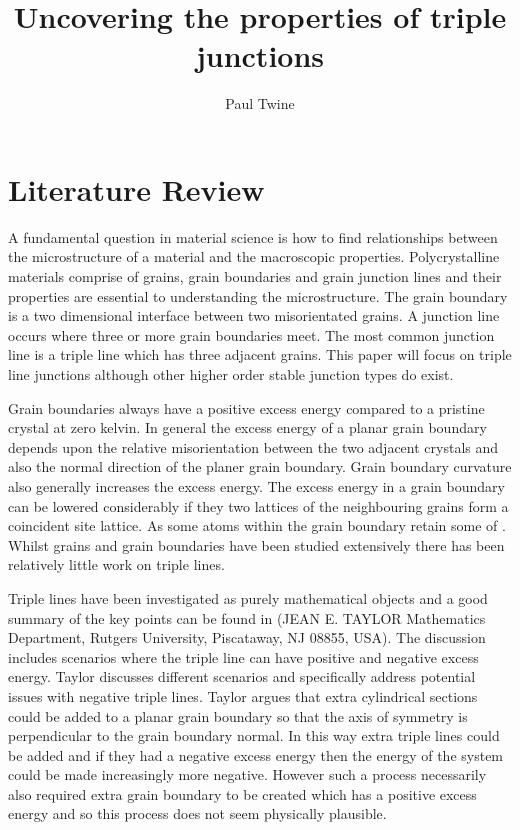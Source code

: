 \documentclass[12pt,a4paper]{book}
\title{Uncovering the properties of triple junctions}
\author{Paul Twine}
\begin{document}
\maketitle

\chapter{Literature Review}

A fundamental question in material science is how to find relationships between the microstructure of a material and the macroscopic properties. Polycrystalline materials comprise of grains, grain boundaries and grain junction lines and their properties are essential to understanding the microstructure. The grain boundary is a two dimensional interface between two misorientated grains. A junction line occurs where three or more grain boundaries meet. The most common junction line is a triple line which has three adjacent grains. This paper will focus on triple line junctions although other higher order stable junction types do exist.

Grain boundaries always have a positive excess energy compared to a pristine crystal at zero kelvin. In general the excess energy of a planar grain boundary depends upon the relative misorientation between the two adjacent crystals and also the normal direction of the planer grain boundary. Grain boundary curvature also generally increases the excess energy. The excess energy in a grain boundary can be lowered considerably if they two lattices of the neighbouring grains form a coincident site lattice. As some atoms within the grain boundary retain some of . Whilst grains and grain boundaries have been studied extensively there has been relatively little work on triple lines.

Triple lines have been investigated as purely mathematical objects and a good summary of the key points can be found in (JEAN E. TAYLOR Mathematics Department, Rutgers University, Piscataway, NJ 08855, USA). The discussion includes scenarios where the triple line can have positive and negative excess energy. Taylor discusses different scenarios and specifically address potential issues with negative triple lines. Taylor argues that extra cylindrical sections could be added to a planar grain boundary so that the axis of symmetry is perpendicular to the grain boundary normal. In this way extra triple lines could be added and if they had a negative excess energy then the energy of the system could be made increasingly more negative. However such a process necessarily also required extra grain boundary to be created which has a positive excess energy and so this process does not seem physically plausible.
\end{document}

